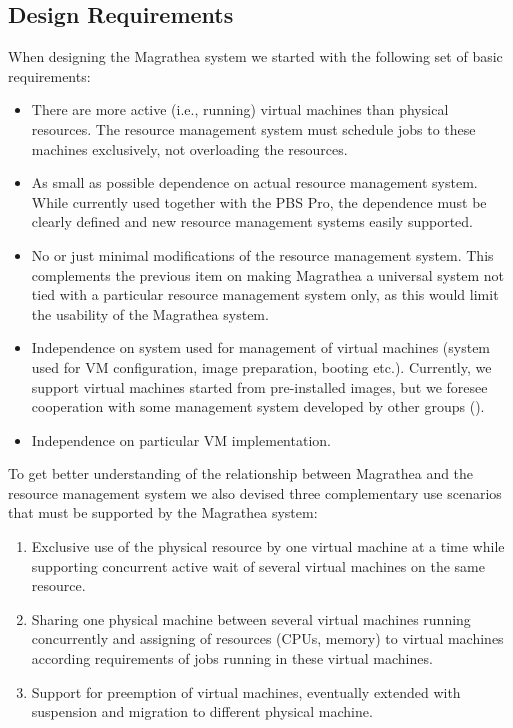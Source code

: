 \documentclass[a4paper]{article}
\begin{document}
\subsection{Design Requirements}

When designing the Magrathea system we started with the following set of basic
requirements:

\begin{itemize}

\item There are more active (i.e., running) virtual machines than physical
resources. The resource management system must schedule jobs to these machines
exclusively, not overloading the resources.

\item As small as possible dependence on actual resource management system.
While currently used together with the PBS Pro, the dependence must be clearly
defined and new resource management systems easily supported.

\item No or just minimal modifications of the resource management system. This
complements the previous item on making Magrathea a universal system not tied
with a particular resource management system only, as this would limit the
usability of the Magrathea system.

\item Independence on system used for management of virtual machines (system
used for VM configuration, image preparation, booting etc.). Currently, we
support virtual machines started from pre-installed images, but we foresee
cooperation with some management system developed by other groups
(\cite{invigo,workspaces}).

\item Independence on particular VM implementation. 

\end{itemize}

To get better understanding of the relationship between Magrathea and the
resource management system we also devised three complementary use scenarios
that must be supported by the Magrathea system:

\begin{enumerate}

\item Exclusive use of the physical resource by one virtual machine at a time
while supporting concurrent active wait of several virtual machines on the
same resource.

\item Sharing one physical machine between several virtual machines running
concurrently and assigning of resources (CPUs, memory) to virtual machines
according requirements of jobs running in these virtual machines.

\item Support for preemption of virtual machines, eventually extended with
suspension and migration to different physical machine.

\end{enumerate}
\end{document}
